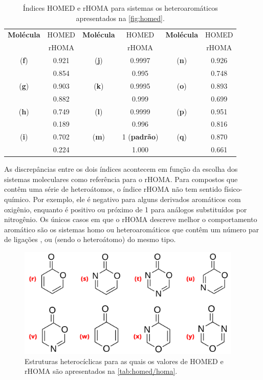 \begin{table}[htb]
	\centering
	\caption{\label{tab:homed/homa} Índices \gls{HOMED} e \gls{rHOMA} para sistemas os heteroaromáticos apresentados na \autoref{fig:homed}.}
	\begin{tabular}{cccccc}
		\toprule
	\textbf{Molécula} & \gls{HOMED} & \textbf{Molécula} & \gls{HOMED} & \textbf{Molécula} & \gls{HOMED}
 \\
  & \gls{rHOMA} & & \gls{rHOMA} & & \gls{rHOMA}
 \\
		\midrule
    (\textbf{f}) & 0.921 & (\textbf{j}) & 0.9997 & (\textbf{n}) & 0.926 \\
    & 0.854 & & 0.995 & & 0.748 \\
    (\textbf{g}) & 0.903 & (\textbf{k}) & 0.9995  & (\textbf{o}) & 0.893 \\
    & 0.882 & & 0.999 & &  0.699 \\
    (\textbf{h}) & 0.749  & (\textbf{l}) & 0.9999 & (\textbf{p}) & 0.951 \\
    & 0.189 & & 0.996 & & 0.816 \\
    (\textbf{i}) & 0.702 & (\textbf{m}) & 1 (\textbf{padrão}) & (\textbf{q}) & 0.870  \\
    & 0.224 & & 1.000 & & 0.661 \\
    \bottomrule
	\end{tabular}
\end{table}

As discrepâncias entre os dois índices acontecem em função da escolha dos sistemas moleculares como referência para o \gls{rHOMA}. Para compostos que contêm uma série de heteroátomos, o índice \gls{rHOMA} não tem sentido físico-químico. Por exemplo, ele é negativo para alguns derivados aromáticos com oxigênio, enquanto é positivo ou próximo de 1 para análogos substituídos por nitrogênio. Os únicos casos em que o \gls{rHOMA} descreve melhor o comportamento aromático são os sistemas homo ou heteroaromáticos que contêm um número par de ligações ,  ou  (sendo  o heteroátomo) do mesmo tipo.

\begin{figure}[htb]
\caption{\label{fig:homed/2} Estruturas heterocíclicas para as quais os valores de \gls{HOMED} e \gls{rHOMA} são apresentados na \autoref{tab:homed/homa}.}
	\begin{center}
		\includegraphics[width=0.95\textwidth]{images/fig2(8).png}
	\end{center}
\end{figure}

